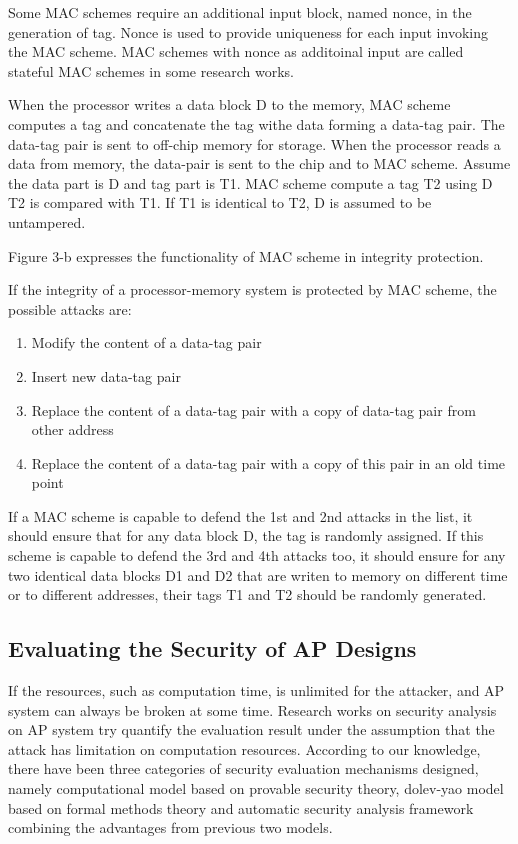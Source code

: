 \documentclass{article}
\begin{document}
Some MAC schemes require an additional input block, named nonce, in the generation of tag. Nonce is used to provide uniqueness for each input invoking the MAC scheme. MAC schemes with nonce as additoinal input are called stateful MAC schemes in some research works.

When the processor writes a data block D to the memory, MAC scheme computes a tag  and concatenate the tag withe data forming a data-tag pair. The data-tag pair is sent to off-chip memory for storage.
When the processor reads a data from memory, the data-pair is sent to the chip and to MAC scheme. Assume the data part is D and tag part is T1. MAC scheme compute a tag T2 using D T2 is compared with T1. If T1 is identical to T2, D is assumed to be untampered.
 
Figure 3-b expresses the functionality of MAC scheme in integrity protection.

If the integrity of a processor-memory system is protected by MAC scheme, the possible attacks are:
\begin{enumerate}
	\item Modify the content of a data-tag pair
	\item Insert new data-tag pair
	\item Replace the content of a data-tag pair with a copy of data-tag pair from other address
	\item Replace the content of a data-tag pair with a copy of this pair in an old time point
\end{enumerate}

If a MAC scheme is capable to defend the 1st and 2nd attacks in the list, it should ensure that for any data block D, the tag is randomly assigned. If this scheme is capable to defend the 3rd and 4th attacks too, it should ensure for any two identical data blocks D1 and D2 that are writen to memory on different time or to different addresses, their tags T1 and T2 should be randomly generated.

\subsection{Evaluating the Security of AP Designs}
If the resources, such as computation time, is unlimited for the attacker, and AP system can always be broken at some time. Research works on security analysis on AP system try quantify the evaluation result under the assumption that the attack has limitation on computation resources. According to our knowledge, there have been three categories of security evaluation mechanisms designed, namely computational model based on provable security theory, dolev-yao model based on formal methods theory and automatic security analysis framework combining the advantages from previous two models.
\end{document}
